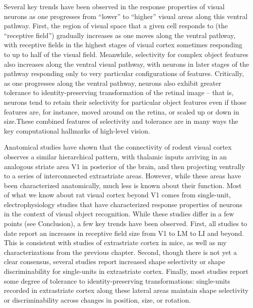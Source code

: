 Several key trends have been observed in the response properties of visual neurons as one progresses from ``lower'' to ``higher'' visual areas along this ventral pathway. First, the region of visual space that a given cell responds to (the ``receptive field'') gradually increases as one moves along the ventral pathway, with receptive fields in the highest stages of visual cortex sometimes responding to up to half of the visual field\cite{OpDeBeeck2001}. Meanwhile, selectivity for complex object features also increases along the ventral visual pathway, with neurons in later stages of the pathway responding only to very particular configurations of features\cite{Desimone1984, Logothetis1996}. Critically, as one progresses along the ventral pathway, neurons also exhibit greater tolerance to identity-preserving transformation of the retinal image -- that is, neurons tend to retain their selectivity for particular object features even if those features are, for instance, moved around on the retina, or scaled up or down in size\cite{Ito1995}.These combined features of selectivity and tolerance are in many ways the key computational hallmarks of high-level vision\cite{DiCarlo2007, DiCarlo2012}. 

Anatomical studies have shown that the connectivity of rodent visual cortex observes a similar hierarchical pattern, with thalamic inputs arriving in an analogous striate area V1 in posterior of the brain, and then projecting ventrally to a series of interconnected extrastriate areas\cite{Coogan1993}. However, while these areas have been characterized anatomically, much less is known about their function. Most of what we know about rat visual cortex beyond V1 comes from single-unit, electrophysiology studies that have characterized response properties of neurons in the context of visual object recognition\cite{Tafazoli2017, Vermaercke2014, Vinken2014}. While these studies differ in a few points (see Conclusion), a few key trends have been observed. First, all studies to date report an increases in receptive field size from V1 to LM to LI and beyond\cite{Tafazoli2017}. This is consistent with studies of extrastriate cortex in mice\cite{Murgas2020, Siegle2021}, as well as my characterizations from the previous chapter. Second, though there is not yet a clear consensus, several studies report increased shape selectivity or shape discriminability for single-units in extrastriate cortex\cite{Tafazoli2017, Vermaercke2014, Vermaercke2015, Vinken2016}. Finally, most studies report some degree of tolerance to identity-preserving transformations: single-units recorded in extrastriate cortex along these lateral areas maintain shape selectivity or discriminability across changes in position, size, or rotation\cite{Vermaercke2014, Tafazoli2017}.

